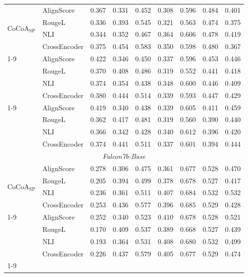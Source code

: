 \documentclass[11pt]{article}
\begin{document}
\begin{table}[htbp]
{\begin{tabular}{ll ccccccc}
\midrule
\multirow{4}{*}{CoCoA$_{\mathrm{SP}}$}
 & AlignScore & 0.367 & 0.331 & 0.452 & 0.308 & 0.596 & 0.484 & 0.401 \\
 & RougeL & 0.336 & 0.393 & 0.545 & 0.321 & 0.563 & 0.474 & 0.375 \\
 & NLI & 0.344 & 0.352 & 0.467 & 0.364 & 0.606 & 0.478 & 0.419 \\
 & CrossEncoder & 0.375 & 0.454 & 0.583 & 0.350 & 0.598 & 0.480 & 0.367 \\
\cmidrule(lr){1-9}
\multirow{4}{*}{CoCoA$_{\mathrm{PPL}}$}
 & AlignScore & 0.422 & 0.346 & 0.450 & 0.337 & 0.596 & 0.453 & 0.446 \\
 & RougeL & 0.370 & 0.408 & 0.486 & 0.319 & 0.552 & 0.441 & 0.418 \\
 & NLI & 0.374 & 0.354 & 0.438 & 0.348 & 0.600 & 0.446 & 0.409 \\
 & CrossEncoder & 0.380 & 0.444 & 0.514 & 0.339 & 0.593 & 0.447 & 0.429 \\
\cmidrule(lr){1-9}
\multirow{4}{*}{CoCoA$_{\mathrm{MTE}}$}
 & AlignScore & 0.419 & 0.340 & 0.438 & 0.339 & 0.605 & 0.411 & 0.459 \\
 & RougeL & 0.362 & 0.417 & 0.481 & 0.319 & 0.560 & 0.390 & 0.440 \\
 & NLI & 0.366 & 0.342 & 0.428 & 0.340 & 0.612 & 0.396 & 0.420 \\
 & CrossEncoder & 0.374 & 0.441 & 0.511 & 0.337 & 0.601 & 0.394 & 0.444 \\
\midrule
\multicolumn{9}{c}{\textit{Falcon7b-Base}} \\
\midrule
\multirow{4}{*}{CoCoA$_{\mathrm{SP}}$}
 & AlignScore & 0.278 & 0.306 & 0.475 & 0.361 & 0.677 & 0.528 & 0.470 \\
 & RougeL & 0.205 & 0.394 & 0.499 & 0.378 & 0.678 & 0.527 & 0.417 \\
 & NLI & 0.236 & 0.361 & 0.511 & 0.407 & 0.684 & 0.532 & 0.532 \\
 & CrossEncoder & 0.253 & 0.436 & 0.577 & 0.396 & 0.685 & 0.529 & 0.428 \\
\cmidrule(lr){1-9}
\multirow{4}{*}{CoCoA$_{\mathrm{PPL}}$}
 & AlignScore & 0.252 & 0.340 & 0.523 & 0.410 & 0.678 & 0.528 & 0.521 \\
 & RougeL & 0.170 & 0.409 & 0.537 & 0.389 & 0.668 & 0.527 & 0.439 \\
 & NLI & 0.193 & 0.364 & 0.531 & 0.408 & 0.680 & 0.532 & 0.499 \\
 & CrossEncoder & 0.226 & 0.437 & 0.579 & 0.405 & 0.677 & 0.529 & 0.474 \\
\cmidrule(lr){1-9}

\end{tabular}}
\end{table}
\end{document}

